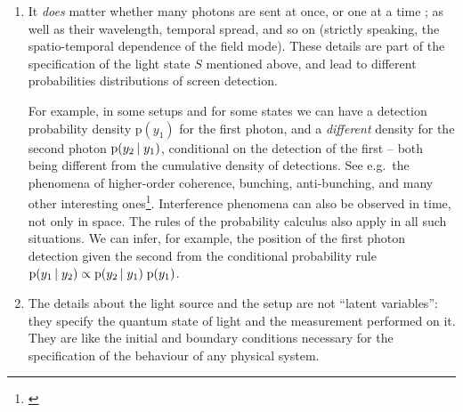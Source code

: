 \documentclass[\ifafour a4paper,12pt,\else a5paper,10pt,\fi%
onecolumn,oneside,article,%
british%
]{memoir}
\theoremstyle{remark}
\theoremstyle{innote}
\newcommand*{\citep}{\parencites}%
\newcommand*{\pf}{\mathrm{p}}%
\renewcommand*{\|}[1][]{\nonscript\,#1\vert\nonscript\;\mathopen{}}
\newcommand*{\sect}{\S}%
\newcommand*{\eg}{{e.g.}}
\newcommand*{\cf}{{cf.}}
\begin{document}
\begin{enumerate}[label=(\textbf{\roman*})]
\item\label{item:q_details} It \emph{does} matter whether many photons are
  sent at once, or one at a time \citep[\cf][\sect~2
  point~1]{gelmanetal2020}; as well as their wavelength, temporal spread,
  and so on (strictly speaking, the spatio-temporal dependence of the field
  mode). These details are part of the specification of the light state $S$
  mentioned above, and lead to different probabilities distributions of
  screen detection.

  For example, in some setups and for some states we can have a detection
  probability density $\pf(y_{1})$ for the first photon, and a
  \emph{different} density for the second photon $\pf(y_{2} \| y_{1})$,
  conditional on the detection of the first -- both being different from
  the cumulative density of detections. See \eg\ the phenomena of
  higher-order coherence, bunching, anti-bunching, and many other
  interesting ones\footnote{\label{fn:ref_interf}\cites[for
    example][]{mandeletal1965,morganetal1966,paul1982,jacobsonetal1995}[and
    textbooks such
    as][]{loudon1973_r2000,mandeletal1995_r2008,scullyetal1997_r2001,bachoretal1998_r2004,wallsetal1994}}.
  Interference phenomena can also be observed in time, not only in space.
  The rules of the probability calculus also apply in all such situations.
  We can infer, for example, the position of the first photon detection
  given the second from the conditional probability rule
  $\pf(y_{1} \| y_{2}) \propto \pf(y_{2} \| y_{1})\;\pf(y_{1})$.
  

\item\label{item:latent_vars} The details about the light source and the
  setup are not \enquote{latent variables}: they specify the quantum state
  of light and the measurement performed on it. They are like the initial
  and boundary conditions necessary for the specification of the behaviour
  of any physical system. %


\end{enumerate}
\end{document}
